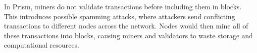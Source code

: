 
 In Prism, miners do not validate transactions before including them in blocks. 
This introduces possible spamming attacks, where attackers send conflicting transactions to different nodes across the network. 
Nodes would then mine all of these transactions into blocks, causing miners and validators to waste storage and computational  resources.


